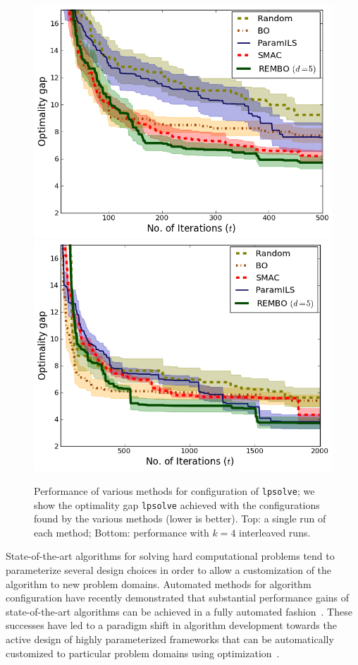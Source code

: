 \documentclass{article}
\begin{document}
\begin{figure}[h!]
\begin{center}
  \includegraphics[scale=0.35]{figures/lpsolve.png}\\
  \includegraphics[scale=0.35]{figures/lpsolve_interleave.png}
  \caption{Performance of various methods for configuration of \texttt{lpsolve}; we show the optimality gap \texttt{lpsolve} achieved with the configurations found by the various methods (lower is better). Top: a single run of each method; Bottom: performance with $k=4$ interleaved runs.}
\end{center}
\vspace*{-2mm}
\label{fig:lpsolve} 
\end{figure}
State-of-the-art algorithms for solving hard computational problems tend to parameterize several design choices in order to allow a customization of the algorithm to new problem domains. Automated methods for algorithm configuration have recently demonstrated that substantial performance gains of state-of-the-art algorithms can be achieved in a fully automated fashion~\cite{Mockus:1999,Hutter:2010,Bergstra:2011,Wang:2011}. These successes have led to a paradigm shift in algorithm development towards the 
active design of highly parameterized frameworks that can be automatically customized to particular problem domains using optimization~\cite{Hoos:2012:PO:2076450.2076469,Bergstra:model_search}.
\end{document}
